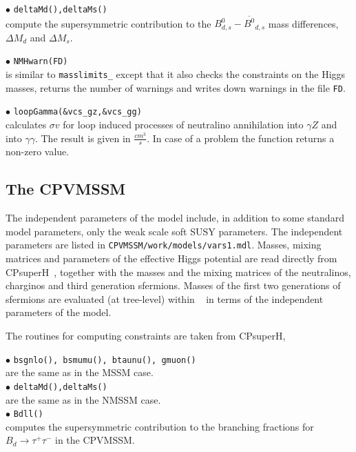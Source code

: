 \documentclass[12pt,a4paper]{article}
\begin{document}
{\noindent$\bullet$ \verb|deltaMd(),deltaMs()|\\
compute the supersymmetric contribution to the $B^0_{d,s}-\overline{B^0}_{d,s}$ mass differences, $\Delta M_d$ and $\Delta M_s$.

\noindent$\bullet$ \verb|NMHwarn(FD)|\\
is similar to {\tt masslimits\_} except that it also checks the 
constraints on the Higgs masses, returns the number of warnings and 
writes down  warnings in the file \verb|FD|.  

\noi$\bullet$ \verb|loopGamma(&vcs_gz,&vcs_gg)|\\
calculates $\sigma v$ for  loop induced processes of neutralino
annihilation into $\gamma Z$ and into $\gamma \gamma$. The result is given in  
$\frac{cm^3}{s}$. In case of a problem the function returns a non-zero value. 


\subsection{The CPVMSSM}

The independent parameters of the model include,
in addition to some standard model parameters, only the weak scale soft SUSY parameters.
The independent parameters are listed in \verb|CPVMSSM/work/models/vars1.mdl|. 
Masses,
mixing matrices and parameters of the effective Higgs potential are read
directly from CPsuperH~\cite{Lee:2003nta,Lee:2007gn}, together with the masses and
the mixing matrices of the neutralinos, charginos and third generation
sfermions.  Masses of the first two generations
of sfermions are evaluated (at tree-level) within \micro~ in
terms of the independent parameters of the model.

The routines for computing constraints are taken from CPsuperH,~\cite{CPSUPERH}


\noindent
$\bullet$ {\tt bsgnlo(), bsmumu(), btaunu(), gmuon() }\\  
are the same as in the MSSM case.\\

\noindent$\bullet$ \verb|deltaMd(),deltaMs()|\\
are the same as in the NMSSM case.\\ 

\noi$\bullet$ \verb|Bdll()|\\
computes the supersymmetric contribution to the branching fractions for
${B}_d\rightarrow\tau^+\tau^-$ in the CPVMSSM.\\ 

}
\end{document}
